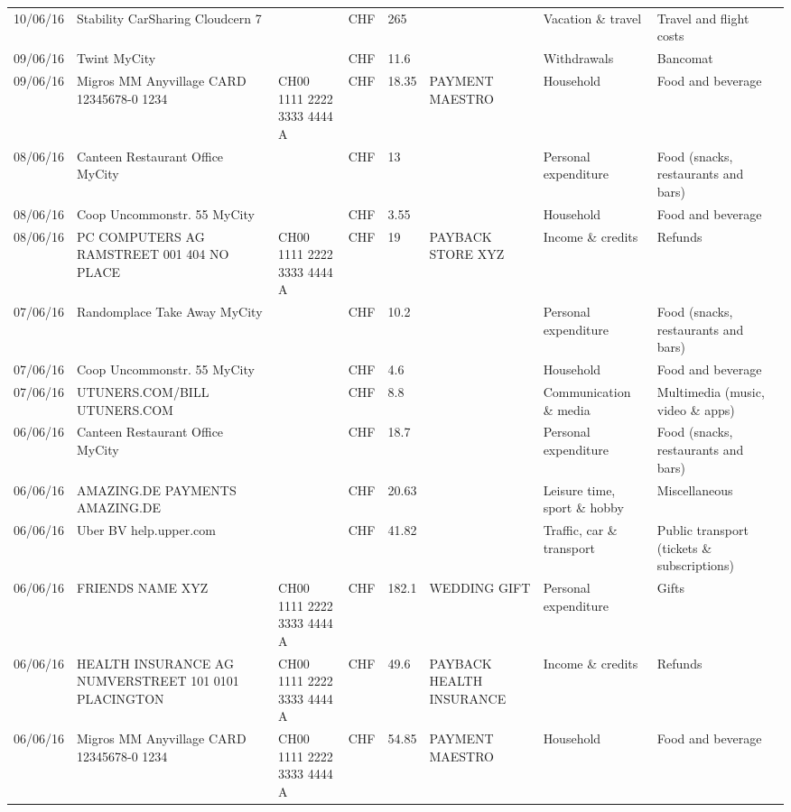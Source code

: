 \begin{landscape}
\begin{tiny}
\begin{longtable}{lp{4cm}llllp{3cm}ll}
		    10/06/16 & Stability CarSharing      Cloudcern 7 &       & CHF   & 265   &       & Vacation \& travel & Travel and flight costs \\
		    09/06/16 & Twint               MyCity &       & CHF   & 11.6  &       & Withdrawals & Bancomat \\
		    09/06/16 & Migros MM Anyvillage CARD 12345678-0 1234 & CH00 1111 2222 3333 4444 A & CHF   & 18.35 & PAYMENT MAESTRO & Household & Food and beverage \\
		    08/06/16 & Canteen Restaurant Office      MyCity &       & CHF   & 13    &       & Personal expenditure & Food (snacks, restaurants and bars) \\
		    08/06/16 & Coop Uncommonstr. 55   MyCity &       & CHF   & 3.55  &       & Household & Food and beverage \\
		    08/06/16 & PC COMPUTERS AG RAMSTREET 001 404 NO PLACE & CH00 1111 2222 3333 4444 A & CHF   & 19    & PAYBACK STORE XYZ & Income \& credits & Refunds \\
		    07/06/16 & Randomplace Take Away     MyCity &       & CHF   & 10.2  &       & Personal expenditure & Food (snacks, restaurants and bars) \\
		    07/06/16 & Coop Uncommonstr. 55   MyCity &       & CHF   & 4.6   &       & Household & Food and beverage \\
		    07/06/16 & UTUNERS.COM/BILL          UTUNERS.COM &       & CHF   & 8.8   &       & Communication \& media & Multimedia (music, video \& apps) \\
		    06/06/16 & Canteen Restaurant Office      MyCity &       & CHF   & 18.7  &       & Personal expenditure & Food (snacks, restaurants and bars) \\
		    06/06/16 & AMAZING.DE PAYMENTS       AMAZING.DE &       & CHF   & 20.63 &       & Leisure time, sport \& hobby & Miscellaneous \\
		    06/06/16 & Uber BV                  help.upper.com &       & CHF   & 41.82 &       & Traffic, car \& transport & Public transport (tickets \& subscriptions) \\
		    06/06/16 & FRIENDS NAME XYZ & CH00 1111 2222 3333 4444 A & CHF   & 182.1 & WEDDING GIFT & Personal expenditure & Gifts \\
		    06/06/16 & HEALTH INSURANCE AG NUMVERSTREET 101 0101 PLACINGTON & CH00 1111 2222 3333 4444 A & CHF   & 49.6  & PAYBACK HEALTH INSURANCE & Income \& credits & Refunds \\
		    06/06/16 & Migros MM Anyvillage CARD 12345678-0 1234 & CH00 1111 2222 3333 4444 A & CHF   & 54.85 & PAYMENT MAESTRO & Household & Food and beverage \\

\end{longtable}
\end{tiny}
\end{landscape}
